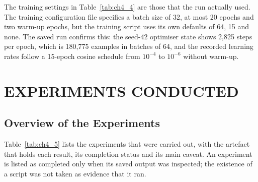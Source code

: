 The training settings in Table~\ref{tab:ch4_4} are those that the run actually used. The training configuration file specifies a batch size of 32, at most 20 epochs and two warm-up epochs, but the training script uses its own defaults of 64, 15 and none. The saved run confirms this: the seed-42 optimiser state shows 2,825 steps per epoch, which is 180,775 examples in batches of 64, and the recorded learning rates follow a 15-epoch cosine schedule from $10^{-4}$ to $10^{-6}$ without warm-up.


\section{EXPERIMENTS CONDUCTED}\label{sec:ch4_3}

\subsection{Overview of the Experiments}\label{sec:ch4_3_1}

Table~\ref{tab:ch4_5} lists the experiments that were carried out, with the artefact that holds each result, its completion status and its main caveat. An experiment is listed as completed only when its saved output was inspected; the existence of a script was not taken as evidence that it ran.

